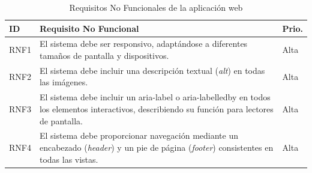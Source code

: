 \begin{table}[H]
\centering
\scriptsize
\begin{tabular}{l p{} l}
\textbf{ID} & \textbf{Requisito No Funcional} & \textbf{Prio.} \\ \hline
RNF1 & El sistema debe ser responsivo, adaptándose a diferentes tamaños de pantalla y dispositivos. & Alta \\ \hline
RNF2 & El sistema debe incluir una descripción textual (\textit{alt}) en todas las imágenes. & Alta \\ \hline
RNF3 & El sistema debe incluir un aria-label o aria-labelledby en todos los elementos interactivos, describiendo su función para lectores de pantalla. & Alta \\ \hline
RNF4 & El sistema debe proporcionar navegación mediante un encabezado (\textit{header}) y un pie de página (\textit{footer}) consistentes en todas las vistas. & Alta \\
\end{tabular}
\caption{Requisitos No Funcionales de la aplicación web}\label{tab:requisitosnofuncionales}
\end{table}



